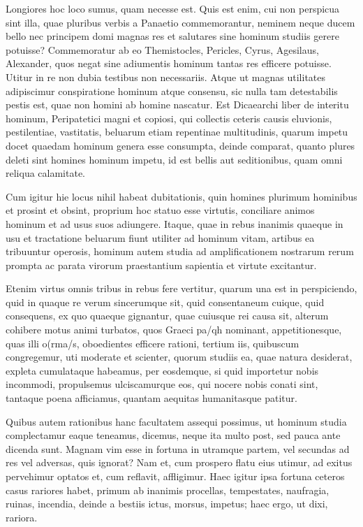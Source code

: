  Longiores hoc loco sumus, quam necesse est. Quis est enim, cui non perspicua sint illa, quae pluribus verbis a Panaetio commemorantur, neminem neque ducem bello nec principem domi magnas res et salutares sine hominum studiis gerere potuisse? Commemoratur ab eo Themistocles, Pericles, Cyrus, Agesilaus, Alexander, quos negat sine adiumentis hominum tantas res efficere potuisse. Utitur in re non dubia testibus non necessariis. Atque ut magnas utilitates adipiscimur conspiratione hominum atque consensu, sic nulla tam detestabilis pestis est, quae non homini ab homine nascatur. Est Dicaearchi liber de interitu hominum, Peripatetici magni et copiosi, qui collectis ceteris causis eluvionis, pestilentiae, vastitatis, beluarum etiam repentinae multitudinis, quarum impetu docet quaedam hominum genera esse consumpta, deinde comparat, quanto plures deleti sint homines hominum impetu, id est bellis aut seditionibus, quam omni reliqua calamitate.

 Cum igitur hie locus nihil habeat dubitationis, quin homines plurimum hominibus et prosint et obsint, proprium hoc statuo esse virtutis, conciliare animos hominum et ad usus suos adiungere. Itaque, quae in rebus inanimis quaeque in usu et tractatione beluarum fiunt utiliter ad hominum vitam, artibus ea tribuuntur operosis, hominum autem studia ad amplificationem nostrarum rerum prompta ac parata virorum praestantium sapientia et virtute excitantur.

 Etenim virtus omnis tribus in rebus fere vertitur, quarum una est in perspiciendo, quid in quaque re verum sincerumque sit, quid consentaneum cuique, quid consequens, ex quo quaeque gignantur, quae cuiusque rei causa sit, alterum cohibere motus animi turbatos, quos Graeci pa/qh nominant, appetitionesque, quas illi o(rma/s, oboedientes efficere rationi, tertium iis, quibuscum congregemur, uti moderate et scienter, quorum studiis ea, quae natura desiderat, expleta cumulataque habeamus, per eosdemque, si quid importetur nobis incommodi, propulsemus ulciscamurque eos, qui nocere nobis conati sint, tantaque poena afficiamus, quantam aequitas humanitasque patitur.

 Quibus autem rationibus hanc facultatem assequi possimus, ut hominum studia complectamur eaque teneamus, dicemus, neque ita multo post, sed pauca ante dicenda sunt. Magnam vim esse in fortuna in utramque partem, vel secundas ad res vel adversas, quis ignorat? Nam et, cum prospero flatu eius utimur, ad exitus pervehimur optatos et, cum reflavit, affligimur. Haec igitur ipsa fortuna ceteros casus rariores habet, primum ab inanimis procellas, tempestates, naufragia, ruinas, incendia, deinde a bestiis ictus, morsus, impetus; haec ergo, ut dixi, rariora.

